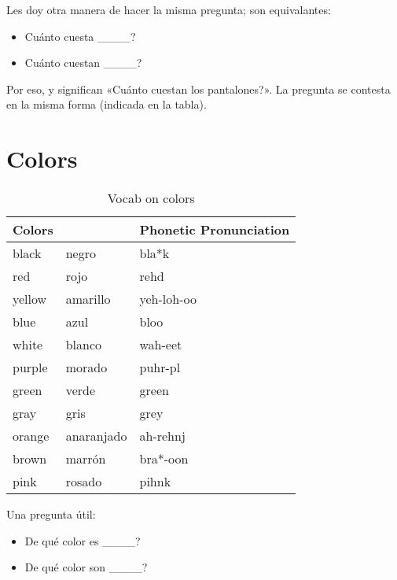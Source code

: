 Les doy otra manera de hacer la misma pregunta; son equivalantes:
\begin{itemize}
	\item \textquestiondown Cu\'anto cuesta \_\_\_\_? \arr {}
	\item \textquestiondown Cu\'anto cuestan \_\_\_\_? \arr {}
\end{itemize}

Por eso,  y 
significan «\textquestiondown Cu\'anto cuestan los pantalones?».
La pregunta se contesta en la misma forma (indicada en la tabla).

\section{Colors}%
\label{sec:Colors}

\begin{table}[H]
	\centering
	\begin{tabular}{lll}
	\toprule
		\textbf{Colors} & \textbf{\ita{Colores}} & \textbf{Phonetic Pronunciation}\\
	\midrule
		black & negro & bla*k\\
		red & rojo & rehd \\
		yellow & amarillo & yeh-loh-oo \\
		blue & azul & bloo \\
		white & blanco & wah-eet \\
		purple & morado & puhr-pl \\
		green & verde & green \\
		gray & gris & grey \\
		orange & anaranjado & ah-rehnj \\
		brown & marr\'on & bra*-oon \\
		pink & rosado & pihnk \\
	\bottomrule
	\end{tabular}
	\caption{Vocab on colors}
\end{table}

Una pregunta \'util:
\begin{itemize}
	\item \textquestiondown De qu\'e color es \_\_\_\_? \arr {}
	\item \textquestiondown De qu\'e color son \_\_\_\_? \arr {}
\end{itemize}


